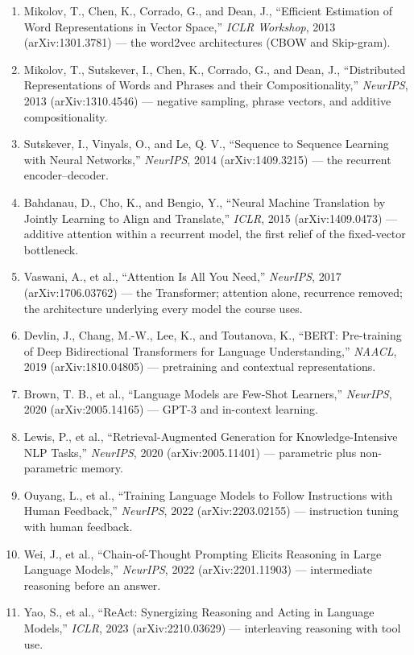 \begin{small}
\begin{enumerate}
\item Mikolov, T., Chen, K., Corrado, G., and Dean, J., ``Efficient Estimation of Word Representations in Vector Space,'' \emph{ICLR Workshop}, 2013 (arXiv:1301.3781) — the word2vec architectures (CBOW and Skip-gram).
\item Mikolov, T., Sutskever, I., Chen, K., Corrado, G., and Dean, J., ``Distributed Representations of Words and Phrases and their Compositionality,'' \emph{NeurIPS}, 2013 (arXiv:1310.4546) — negative sampling, phrase vectors, and additive compositionality.
\item Sutskever, I., Vinyals, O., and Le, Q. V., ``Sequence to Sequence Learning with Neural Networks,'' \emph{NeurIPS}, 2014 (arXiv:1409.3215) — the recurrent encoder--decoder.
\item Bahdanau, D., Cho, K., and Bengio, Y., ``Neural Machine Translation by Jointly Learning to Align and Translate,'' \emph{ICLR}, 2015 (arXiv:1409.0473) — additive attention within a recurrent model, the first relief of the fixed-vector bottleneck.
\item Vaswani, A., et al., ``Attention Is All You Need,'' \emph{NeurIPS}, 2017 (arXiv:1706.03762) — the Transformer; attention alone, recurrence removed; the architecture underlying every model the course uses.
\item Devlin, J., Chang, M.-W., Lee, K., and Toutanova, K., ``BERT: Pre-training of Deep Bidirectional Transformers for Language Understanding,'' \emph{NAACL}, 2019 (arXiv:1810.04805) — pretraining and contextual representations.
\item Brown, T. B., et al., ``Language Models are Few-Shot Learners,'' \emph{NeurIPS}, 2020 (arXiv:2005.14165) — GPT-3 and in-context learning.
\item Lewis, P., et al., ``Retrieval-Augmented Generation for Knowledge-Intensive NLP Tasks,'' \emph{NeurIPS}, 2020 (arXiv:2005.11401) — parametric plus non-parametric memory.
\item Ouyang, L., et al., ``Training Language Models to Follow Instructions with Human Feedback,'' \emph{NeurIPS}, 2022 (arXiv:2203.02155) — instruction tuning with human feedback.
\item Wei, J., et al., ``Chain-of-Thought Prompting Elicits Reasoning in Large Language Models,'' \emph{NeurIPS}, 2022 (arXiv:2201.11903) — intermediate reasoning before an answer.
\item Yao, S., et al., ``ReAct: Synergizing Reasoning and Acting in Language Models,'' \emph{ICLR}, 2023 (arXiv:2210.03629) — interleaving reasoning with tool use.
\end{enumerate}
\end{small}
